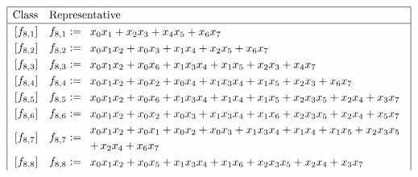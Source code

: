 \documentclass[pdf,sprung,slideColor,nocolorBG]{beamer}
\newenvironment{colortheme}[1]{
\def\ProvidesPackageRCS $##1${\relax}
\renewcommand{\ProcessOptions}{\relax}
\makeatletter

\makeatother
}{}
\begin{document}
\begin{colortheme}{seagull}
\begin{frame}
\tiny{}
\begin{align*}
\def\arraystretch{1.2}
\begin{array}{|cl|}
\hline
\text{Class} &
\text{Representative}
\\
\hline
\,[f_{ 8 , 1 }] & f_{ 8 , 1 } :=
\begin{array}{l}
x_{0} x_{1} + x_{2} x_{3} + x_{4} x_{5} + x_{6} x_{7}
\end{array}
\\
\,[f_{ 8 , 2 }] & f_{ 8 , 2 } :=
\begin{array}{l}
x_{0} x_{1} x_{2} + x_{0} x_{3} + x_{1} x_{4} + x_{2} x_{5} + x_{6} x_{7}
\end{array}
\\
\,[f_{ 8 , 3 }] & f_{ 8 , 3 } :=
\begin{array}{l}
x_{0} x_{1} x_{2} + x_{0} x_{6} + x_{1} x_{3} x_{4} + x_{1} x_{5} + x_{2} x_{3} + x_{4} x_{7}
\end{array}
\\
\,[f_{ 8 , 4 }] & f_{ 8 , 4 } :=
\begin{array}{l}
x_{0} x_{1} x_{2} + x_{0} x_{2} + x_{0} x_{4} + x_{1} x_{3} x_{4} + x_{1} x_{5} + x_{2} x_{3} + x_{6} x_{7}
\end{array}
\\
\,[f_{ 8 , 5 }] & f_{ 8 , 5 } :=
\begin{array}{l}
x_{0} x_{1} x_{2} + x_{0} x_{6} + x_{1} x_{3} x_{4} + x_{1} x_{4} + x_{1} x_{5} + x_{2} x_{3} x_{5} + x_{2} x_{4} + x_{3} x_{7}
\end{array}
\\
\,[f_{ 8 , 6 }] & f_{ 8 , 6 } :=
\begin{array}{l}
x_{0} x_{1} x_{2} + x_{0} x_{2} + x_{0} x_{3} + x_{1} x_{3} x_{4} + x_{1} x_{6} + x_{2} x_{3} x_{5} + x_{2} x_{4} + x_{5} x_{7}
\end{array}
\\
\,[f_{ 8 , 7 }] & f_{ 8 , 7 } :=
\begin{array}{l}
x_{0} x_{1} x_{2} + x_{0} x_{1} + x_{0} x_{2} + x_{0} x_{3} + x_{1} x_{3} x_{4} + x_{1} x_{4} + x_{1} x_{5} + x_{2} x_{3} x_{5}
\\
+\,  x_{2} x_{4} + x_{6} x_{7}
\end{array}
\\
\,[f_{ 8 , 8 }] & f_{ 8 , 8 } :=
\begin{array}{l}
x_{0} x_{1} x_{2} + x_{0} x_{5} + x_{1} x_{3} x_{4} + x_{1} x_{6} + x_{2} x_{3} x_{5} + x_{2} x_{4} + x_{3} x_{7}
\end{array}
\\

\end{array}
\end{align*}
\end{frame}
\end{colortheme}
\end{document}
